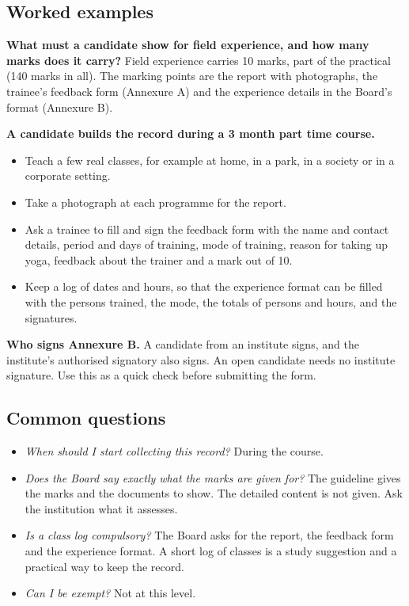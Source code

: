 \subsection*{Worked examples}

\textbf{What must a candidate show for field experience, and how many marks does it carry?} Field experience carries 10 marks, part of the practical (140 marks in all). The marking points are the report with photographs, the trainee's feedback form (Annexure A) and the experience details in the Board's format (Annexure B).

\textbf{A candidate builds the record during a 3 month part time course.}
\begin{itemize}
\item Teach a few real classes, for example at home, in a park, in a society or in a corporate setting.
\item Take a photograph at each programme for the report.
\item Ask a trainee to fill and sign the feedback form with the name and contact details, period and days of training, mode of training, reason for taking up yoga, feedback about the trainer and a mark out of 10.
\item Keep a log of dates and hours, so that the experience format can be filled with the persons trained, the mode, the totals of persons and hours, and the signatures.
\end{itemize}

\textbf{Who signs Annexure B.} A candidate from an institute signs, and the institute's authorised signatory also signs. An open candidate needs no institute signature. Use this as a quick check before submitting the form.

\subsection*{Common questions}

\begin{itemize}
\item \emph{When should I start collecting this record?} During the course.
\item \emph{Does the Board say exactly what the marks are given for?} The guideline gives the marks and the documents to show. The detailed content is not given. Ask the institution what it assesses.
\item \emph{Is a class log compulsory?} The Board asks for the report, the feedback form and the experience format. A short log of classes is a study suggestion and a practical way to keep the record.
\item \emph{Can I be exempt?} Not at this level.
\end{itemize}

